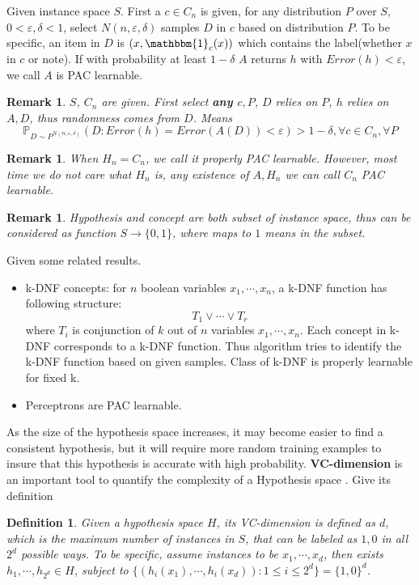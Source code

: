 \documentclass[12pt, a4paper, oneside]{article}
\newtheorem{definition}[theorem]{Definition}
\newtheorem{remark}[theorem]{Remark}
\begin{document}
Given instance space $S$. First a $c\in C_n$ is given, for any distribution $P$ over $S$, $0<\varepsilon,\delta<1$, select $N(n,\varepsilon,\delta)$ samples $D$ in $c$ based on distribution $P$. To be specific, an item in $D$ is $(x,\mathbbm{1}_c(x))$ which contains the label(whether $x$ in $c$ or note). If with probability at least $1-\delta$ $A$ returns $h$ with $Error(h)<\varepsilon$, we call $A$ is PAC learnable.
\begin{remark}
    $S$, $C_n$ are given. First select \textbf{any $c,P$}, $D$ relies on $P$, $h$ relies on $A,D$, thus randomness comes from $D$. Means
    \begin{equation*}
        \mathbb{P}_{D\sim P^{N(n,\varepsilon,\delta)}}(D:Error(h)=Error(A(D))<\varepsilon)>1-\delta,\forall c\in C_n,\forall P
    \end{equation*}
\end{remark}
\begin{remark}
    When $H_n=C_n$, we call it properly PAC learnable. However, most time we do not care what $H_n$ is, any existence of $A,H_n$ we can call $C_n$ PAC learnable.
\end{remark}
\begin{remark}
    Hypothesis and concept are both subset of instance space, thus can be considered as function $S\rightarrow\{0,1\}$, where maps to $1$ means in the subset.
\end{remark}


Given some related results.
\begin{itemize}
    \item k-DNF concepts\cite{valiant1985learning}: for $n$ boolean variables $x_1,\cdots,x_n$, a k-DNF function has following structure:
    \begin{equation*}
        T_1\vee \cdots\vee T_r
    \end{equation*}
    where $T_i$ is conjunction of $k$ out of $n$ variables $x_1,\cdots,x_n$. Each concept in k-DNF corresponds to a k-DNF function. Thus algorithm tries to identify the k-DNF function based on given samples. Class of k-DNF is properly learnable for fixed k.
    \item Perceptrons are PAC learnable\cite{blumer1989learnability}.
\end{itemize}


As the size of the hypothesis space increases, it may become easier to find a consistent hypothesis, but it will require more random training examples to insure that this hypothesis is accurate with high probability. \textbf{VC-dimension} is an important tool to quantify the complexity of a Hypothesis space\cite{shawe1993bounding} \cite{natarajan1989learning} \cite{vapnik2006estimation} \cite{haussler1987andrzej}. Give its definition
\begin{definition}
    Given a hypothesis space $H$, its VC-dimension is defined as $d$, which is the maximum number of instances in $S$, that can be labeled as $1,0$ in all $2^d$ possible ways. To be specific, assume instances to be $x_1,\cdots,x_d$, then exists $h_1,\cdots,h_{2^d}\in H$, subject to $\{(h_i(x_1),\cdots,h_i(x_d)):1\leq i\leq 2^d\}=\{1,0\}^d$.
\end{definition}
\end{document}
